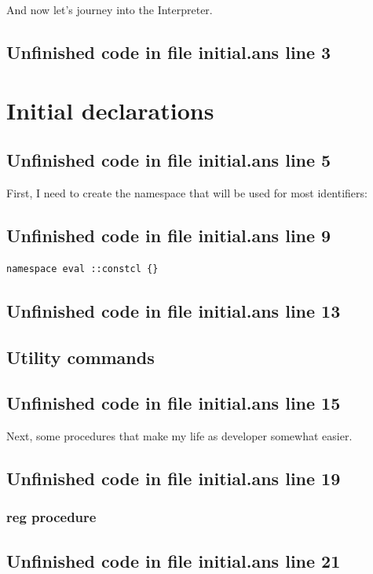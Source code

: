 \documentclass[twoside,9pt]{report}
\begin{document}
And now let's journey into the Interpreter.
\section{Unfinished code in file initial.ans line 3}
\chapter{Initial declarations}
\label{initial-declarations}
\section{Unfinished code in file initial.ans line 5}


First, I need to create the namespace that will be used for most identifiers:

\section{Unfinished code in file initial.ans line 9}
\begin{lstlisting}
namespace eval ::constcl {}
\end{lstlisting}
\section{Unfinished code in file initial.ans line 13}
\section{Utility commands}
\label{utility-commands}
\section{Unfinished code in file initial.ans line 15}


Next, some procedures that make my life as developer somewhat easier.

\section{Unfinished code in file initial.ans line 19}
\subsection{reg procedure}
\label{reg-procedure}
\section{Unfinished code in file initial.ans line 21}
\end{document}
